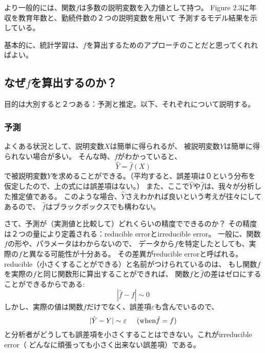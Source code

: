 \documentclass{jsbook}
\begin{document}
より一般的には、関数$f$は多数の説明変数を入力値として持つ。
Figure 2.3に年収を教育年数と、勤続件数の２つの説明変数を用いて
予測するモデル結果を示している。

基本的に、統計学習は、$f$を算出するためのアプローチのことだと思ってくれればよい。

\subsection{なぜ$f$を算出するのか？}
目的は大別すると２つある：予測と推定。以下、それぞれについて説明する。

\subsubsection{予測}
よくある状況として、説明変数$X$は簡単に得られるが、
被説明変数$Y$は簡単に得られない場合が多い。
そんな時、$f$がわかっていると、
\begin{equation}
	\hat{Y} = \hat{f}(X)
\end{equation}
で被説明変数$Y$を求めることができる。（平均すると、誤差項は０という分布を
仮定したので、上の式には誤差項はない。）
また、ここで$\hat{Y}$や$\hat{f}$は、我々が分析した推定値である。
このような場合、$\hat{Y}$さえわかれば良いという考えが往々にしてあるので、
$\hat{f}$はブラックボックスでも構わない。

さて、予測が（実測値と比較して）どれくらいの精度でできるのか？
その精度は２つの量により定義される：reducible errorとirreducible error。
一般に、関数$f$の形や、パラメータはわからないので、
データから$f$を特定したとしても、実際の$f$と異なる可能性が十分ある。
その差異がreducible errorと呼ばれる。
reducible（小さくすることができる）と名前がつけられているのは、
もし関数$f$を実際の$f$と同じ関数形に算出することができれば、
関数$f$と$\hat{f}$の差はゼロにすることができるからである:
$$
	|\hat{f} - f| \sim 0
$$
しかし、実際の値は関数$f$だけでなく、誤差項$\varepsilon$も含んでいるので、
$$
	|\hat{Y} - Y| \sim \varepsilon \hspace{5mm} (\text{when}  \hat{f} = f)
$$
と分析者がどうしても誤差項を小さくすることはできない。これがirreducible error（
どんなに頑張っても小さく出来ない誤差項）である。
\end{document}
